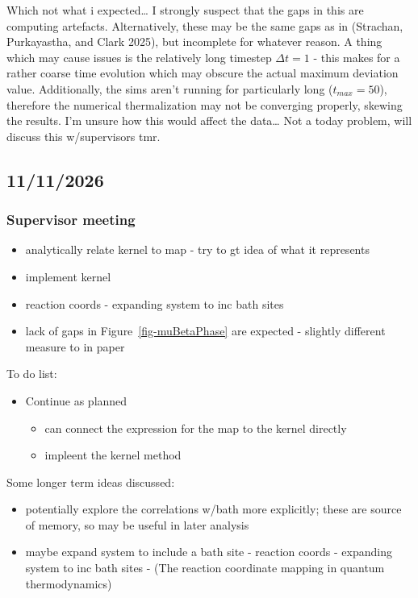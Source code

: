 \documentclass[
  letterpaper,
  DIV=11,
  numbers=noendperiod]{scrartcl}
\providecommand{\tightlist}{%
  \setlength{\itemsep}{0pt}\setlength{\parskip}{0pt}}
\begin{document}
Which not what i expected\ldots{} I strongly suspect that the gaps in
this are computing artefacts. Alternatively, these may be the same gaps
as in (Strachan, Purkayastha, and Clark 2025), but incomplete for
whatever reason. A thing which may cause issues is the relatively long
timestep \(\Delta t=1\) - this makes for a rather coarse time evolution
which may obscure the actual maximum deviation value. Additionally, the
sims aren't running for particularly long (\(t_{max}=50\)), therefore
the numerical thermalization may not be converging properly, skewing the
results. I'm unsure how this would affect the data\ldots{} Not a today
problem, will discuss this w/supervisors tmr.

\subsection{11/11/2026}\label{section-1}

\subsubsection{Supervisor meeting}\label{supervisor-meeting}

\begin{itemize}
\tightlist
\item
  analytically relate kernel to map - try to gt idea of what it
  represents
\item
  implement kernel
\item
  reaction coords - expanding system to inc bath sites
\item
  lack of gaps in Figure~\ref{fig-muBetaPhase} are expected - slightly
  different measure to in paper
\end{itemize}

To do list:

\begin{itemize}
\tightlist
\item
  Continue as planned

  \begin{itemize}
  \tightlist
  \item
    can connect the expression for the map to the kernel directly
  \item
    impleent the kernel method
  \end{itemize}
\end{itemize}

Some longer term ideas discussed:

\begin{itemize}
\tightlist
\item
  potentially explore the correlations w/bath more explicitly; these are
  source of memory, so may be useful in later analysis
\item
  maybe expand system to include a bath site - reaction coords -
  expanding system to inc bath sites - (The reaction coordinate mapping
  in quantum thermodynamics)
\end{itemize}
\end{document}
